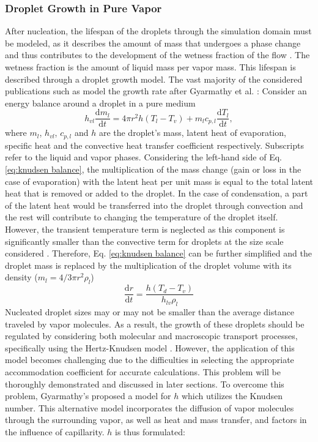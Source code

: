 \documentclass[12pt]{article}
\numberwithin{equation}{section}
\begin{document}
\subsubsection{Droplet Growth in Pure Vapor}\label{sss:Literature-Droplet Growth pure}
After nucleation, the lifespan of the droplets through the simulation domain must be modeled, as it describes the amount of mass that undergoes a phase change and thus contributes to the development of the wetness fraction of the flow \cite{starzmann2010non}. The wetness fraction is the amount of liquid mass per vapor mass. This lifespan is described through a droplet growth model. The vast majority of the considered publications such as \cite{yang2017cfd,zheng2018modeling,liu2020condensation,patel2016influence,gerber2004pressure} model the growth rate after Gyarmathy et al. \cite{gyarmathy1962grundlagen}: Consider an energy balance around a droplet in a pure medium
\begin{equation}\label{eq:knudsen balance}
    h_{vl}\frac{\mathrm{d} m_{l}}{\mathrm{d}t}=4\pi r^{2}h  (T_{l}-T_{v})+m_{l}c_{p,l}\frac{\mathrm{d}T_{l}}{\mathrm{d}t},
\end{equation}
where $m_{l}$, $h_{vl}$, $c_{p,l}$ and $h$ are the droplet's mass, latent heat of evaporation, specific heat and the convective heat transfer coefficient respectively. Subscripts refer to the liquid and vapor phases.
Considering the left-hand side of Eq. \ref{eq:knudsen balance}, the multiplication of the mass change (gain or loss in the case of evaporation) with the latent heat per unit mass is equal to the total latent heat that is removed or added to the droplet. In the case of condensation, a part of the latent heat would be transferred into the droplet through convection and the rest will contribute to changing the temperature of the droplet itself. However, the transient temperature term is neglected as this component is significantly smaller than the convective term for droplets at the size scale considered \cite{gerber2004pressure}. Therefore, Eq. \ref{eq:knudsen balance} can be further simplified and the droplet mass is replaced by the multiplication of the droplet volume with its density ($m_{l}=4/3\pi r^{2}\rho_{l}$)
\begin{equation}\label{eq:knudsen growth rate}
    \frac{\mathrm{d}r}{\mathrm{d}t}=\frac{h(T_{d}-T_{v})}{h_{lv}\rho_{l}}
\end{equation}
Nucleated droplet sizes may or may not be smaller than the average distance traveled by vapor molecules. As a result, the growth of these droplets should be regulated by considering both molecular and macroscopic transport processes, specifically using the Hertz-Knudsen model \cite{wroblewski2009numerical}. However, the application of this model becomes challenging due to the difficulties in selecting the appropriate accommodation coefficient for accurate calculations. This problem will be thoroughly demonstrated and discussed in later sections. To overcome this problem, Gyarmathy's \cite{moore1976two} proposed a model for $h$ which utilizes the Knudsen number. This alternative model incorporates the diffusion of vapor molecules through the surrounding vapor, as well as heat and mass transfer, and factors in the influence of capillarity. $h$ is thus formulated:
\end{document}
